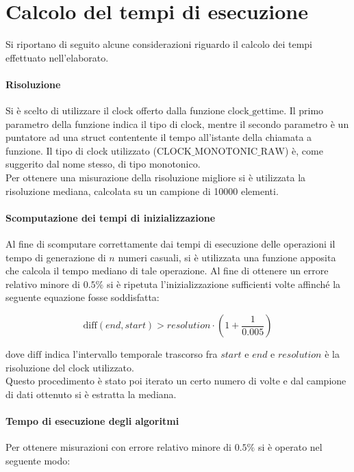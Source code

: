 \documentclass{article}
\begin{document}
	\newpage
	\section{Calcolo del tempi di esecuzione}	
	Si riportano di seguito alcune	considerazioni riguardo il calcolo dei tempi effettuato nell'elaborato.
	
	\paragraph{Risoluzione}
	Si è scelto di utilizzare il clock offerto dalla funzione $\text{clock\_gettime}$. Il primo parametro della funzione indica il tipo di clock, mentre il secondo parametro è un puntatore ad una struct contentente il tempo all'istante della chiamata a funzione. Il tipo di clock utilizzato ($\text{CLOCK\_MONOTONIC\_RAW}$) è, come suggerito dal nome stesso, di tipo monotonico. \\ Per ottenere una misurazione della risoluzione migliore si è utilizzata la risoluzione mediana, calcolata su un campione di 10000 elementi.
	
	\paragraph{Scomputazione dei tempi di inizializzazione}
	Al fine di scomputare correttamente dai tempi di esecuzione delle operazioni il tempo di generazione di $n$ numeri casuali, si è utilizzata una funzione apposita che calcola il tempo mediano di tale operazione. Al fine di ottenere un errore relativo minore di $0.5\%$ si è ripetuta l'inizializzazione sufficienti volte affinché la seguente equazione fosse soddisfatta:
	
	\[
		\text{diff}\left(end, start\right) > resolution \cdot \left(1+\frac{1}{0.005}\right)  
	\]
	
	dove $\text{diff}$ indica l'intervallo temporale trascorso fra $start$ e $end$ e $resolution$ è la risoluzione del clock utilizzato. \\ Questo procedimento è stato poi iterato un certo numero di volte e dal campione di dati ottenuto si è estratta la mediana.
	
	\paragraph{Tempo di esecuzione degli algoritmi}
	Per ottenere misurazioni con errore relativo minore di $0.5\%$ si è operato nel seguente modo:
	
\end{document}
